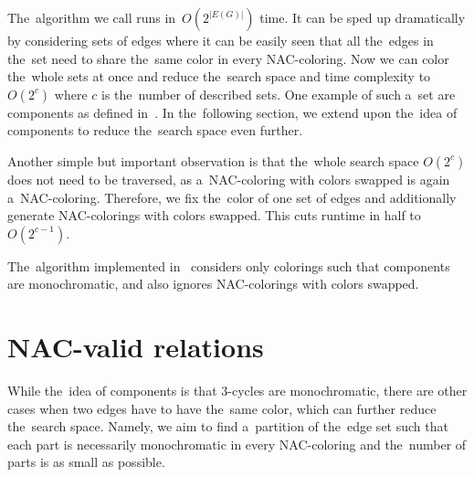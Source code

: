 The~algorithm we call \Naive{} runs in~\( O(2^{|E(G)|}) \) time.
It can be sped up dramatically by considering sets of edges
where it can be easily seen that all the~edges in the~set need to share
the~same color in every NAC-coloring.
%
Now we can color the~whole sets at once
and reduce the~search space and time complexity to \( O(2^{c}) \)
where \( c \) is the~number of described sets.
One example of such a~set are \trcon{} components
as defined in~.
In the~following section, we extend upon the~idea of \trcon{} components
to reduce the~search space even further.

Another simple but important observation is that the~whole search space \( O(2^{c}) \)
does not need to be traversed, as a~NAC-coloring with colors swapped is again a~NAC-coloring.
Therefore, we fix the~color of one set of edges and additionally generate NAC-colorings with colors swapped.
This cuts runtime in half%
to \( O(2^{c-1}) \).


The~algorithm implemented in~\flexrilog{}
considers only colorings such that \trcon{} components are monochromatic,
and also ignores NAC-colorings with colors swapped.

\section{NAC-valid relations}%
\label{sec:NACvalid}

While the~idea of \trcon{} components is that 3-cycles are monochromatic,
there are other cases when two edges have to have the~same color,
which can further reduce the~search space.
Namely, we aim to find a~partition of the~edge set such that each part is necessarily monochromatic
in every NAC-coloring and the~number of parts is as small as possible.

